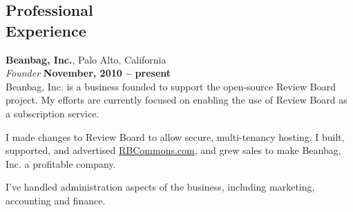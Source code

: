 \documentclass[margin,line]{resume}
\begin{document}
\begin{resume}
    \section{\mysidestyle Professional\\Experience}

    {\bf Beanbag, Inc.}, Palo Alto, California \vspace{2mm}\\\vspace{1mm}%
    {\sl Founder} \hfill {\bf November, 2010 -- present }\\
    Beanbag, Inc. is a business founded to support the open-source Review Board
    project. My efforts are currently focused on enabling the use of Review
    Board as a subscription service.
    \vspace{3mm}
    \begin{list1}
    \item I made changes to Review Board to allow secure, multi-tenancy hosting.
          I built, supported, and advertised \url{RBCommons.com}, and grew sales
          to make Beanbag, Inc. a profitable company.
    \item I've handled administration aspects of the business, including
          marketing, accounting and finance.
    \end{list1}


\end{resume}
\end{document}
